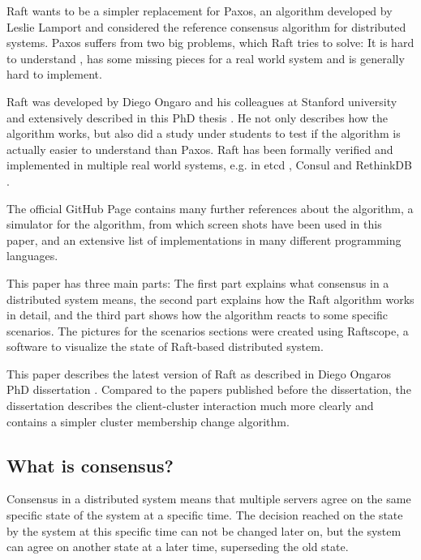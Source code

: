 Raft wants to be a simpler replacement for Paxos, an algorithm developed by Leslie Lamport and considered the reference consensus algorithm for distributed systems\cite{paxos}. Paxos suffers from two big problems, which Raft tries to solve: It is hard to understand \cite[p.91]{raft_phd_thesis}, has some missing pieces for a real world system and is generally hard to implement\cite{paxos_made_live}.

Raft was developed by Diego Ongaro and his colleagues at Stanford university and extensively described in this PhD thesis \cite{raft_phd_thesis}. He not only describes how the algorithm works, but also did a study under students to test if the algorithm is actually easier to understand than Paxos. Raft has been formally verified \cite{raft_proof} and implemented in multiple real world systems, e.g. in etcd \cite{etcd_raft}, Consul \cite{consul_raft} and RethinkDB \cite{rethinkdb_raft}.

The official GitHub Page \cite{raft_github} contains many further references about the algorithm, a simulator for the algorithm, from which screen shots have been used in this paper, and an extensive list of implementations in many different programming languages.

This paper has three main parts: The first part explains what consensus in a distributed system means, the second part explains how the Raft algorithm works in detail, and the third part shows how the algorithm reacts to some specific scenarios.
The pictures for the scenarios sections were created using Raftscope\cite{raftscope}, a software to visualize the state of Raft-based distributed system.

This paper describes the latest version of Raft as described in Diego Ongaros PhD dissertation \cite{raft_phd_thesis}. Compared to the papers published before the dissertation, the dissertation describes the client-cluster interaction much more clearly and contains a simpler cluster membership change algorithm.

\subsection{What is consensus?}

Consensus in a distributed system means that multiple servers agree on the same specific state of the system at a specific time. The decision reached on the state by the system at this specific time can not be changed later on, but the system can agree on another state at a later time, superseding the old state.

